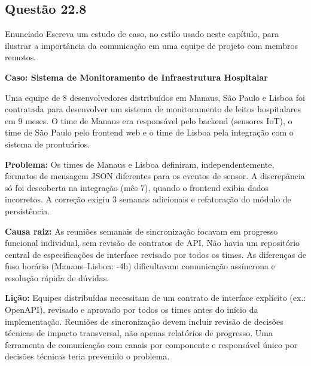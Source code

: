 \documentclass[12pt,a4paper]{article}
\begin{document}
\subsection*{Questão 22.8}
\begin{questao}{Enunciado}
Escreva um estudo de caso, no estilo usado neste capítulo, para ilustrar a
importância da comunicação em uma equipe de projeto com membros remotos.
\end{questao}
\begin{resposta}
\textbf{Caso: Sistema de Monitoramento de Infraestrutura Hospitalar}

Uma equipe de 8 desenvolvedores distribuídos em Manaus, São Paulo e Lisboa
foi contratada para desenvolver um sistema de monitoramento de leitos
hospitalares em 9 meses. O time de Manaus era responsável pelo backend
(sensores IoT), o time de São Paulo pelo frontend web e o time de Lisboa
pela integração com o sistema de prontuários.

\textbf{Problema:} Os times de Manaus e Lisboa definiram, independentemente,
formatos de mensagem JSON diferentes para os eventos de sensor. A discrepância
só foi descoberta na integração (mês 7), quando o frontend exibia dados
incorretos. A correção exigiu 3 semanas adicionais e refatoração do
módulo de persistência.

\textbf{Causa raiz:} As reuniões semanais de sincronização focavam em
progresso funcional individual, sem revisão de contratos de API. Não havia
um repositório central de especificações de interface revisado por todos
os times. As diferenças de fuso horário (Manaus--Lisboa: -4h) dificultavam
comunicação assíncrona e resolução rápida de dúvidas.

\textbf{Lição:} Equipes distribuídas necessitam de um contrato de interface
explícito (ex.: OpenAPI), revisado e aprovado por todos os times antes do
início da implementação. Reuniões de sincronização devem incluir revisão
de decisões técnicas de impacto transversal, não apenas relatórios de
progresso. Uma ferramenta de comunicação com canais por componente e
responsável único por decisões técnicas teria prevenido o problema.
\end{resposta}

\end{document}
